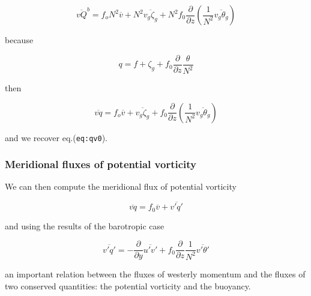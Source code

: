 {\[\overline{v Q}^b  = f_o N^2 \overline{v} + N^2 \overline{v_g\zeta_g} + N^2 f_0 \frac{\partial }{\partial z}\left(\frac{1}{N^2}\overline{v_g\theta_g}\right)\]}

because

\[q = f + \zeta_g + f_0 \frac{\partial }{\partial z} \frac{\theta}{N^2}\]

then

\[\overline{v q}  = f_o  \overline{v} +  \overline{v_g\zeta_g} + f_0 \frac{\partial }{\partial z}\left(\frac{1}{N^2}\overline{v_g\theta_g}\right)\]

and we recover eq.(\texttt{eq:qv0}).

\subsubsection{Meridional fluxes of potential
vorticity}\label{meridional-fluxes-of-potential-vorticity}

We can then compute the meridional flux of potential vorticity

\[\overline{v q} = f_0 \overline{v} +\overline{v'q'}\]

and using the results of the barotropic case

{\[\overline{v'q'} = -\frac{\partial }{\partial y} \overline{u'v'} + f_0 \frac{\partial }{\partial z} \frac{1}{N^2} \overline{v'\theta'}\]}

an important relation between the fluxes of westerly momentum and the
fluxes of two conserved quantities: the potential vorticity and the
buoyancy.

